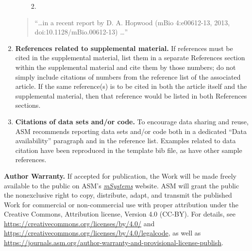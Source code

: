 \documentclass[
  lineno]{asm}
\providecommand{\tightlist}{%
  \setlength{\itemsep}{0pt}\setlength{\parskip}{0pt}}\usepackage{longtable,booktabs,array}
\begin{document}
\begin{enumerate}
\begin{itemize}
    \begin{enumerate}
    \def\labelenumii{\arabic{enumii})}
    \setcounter{enumii}{2005}
    \tightlist
    \item
    \end{enumerate}
  \end{itemize}

  \begin{quote}
   ``\ldots  in a recent report by D. A. Hopwood (mBio 4:e00612-13, 2013, doi:10.1128/mBio.00612-13) \ldots''
   \end{quote}
\item
  \textbf{References related to supplemental material.} If references
  must be cited in the supplemental material, list them in a separate
  References section within the supplemental material and cite them by
  those numbers; do not simply include citations of numbers from the
  reference list of the associated article. If the same reference(s) is
  to be cited in both the article itself and the supplemental material,
  then that reference would be listed in both References sections.
\item
  \textbf{Citations of data sets and/or code.} To encourage data sharing
  and reuse, ASM recommends reporting data sets and/or code both in a
  dedicated ``Data availability'' paragraph and in the reference list.
  Examples related to data citation have been reproduced in the template
  bib file, as have other sample references.
\end{enumerate}

\textbf{Author Warranty.} If accepted for publication, the Work will be
made freely available to the public on ASM's
\href{https://journals.asm.org/journal/msystems}{\emph{mSystems}}
website. ASM will grant the public the nonexclusive right to copy,
distribute, adapt, and transmit the published Work for commercial or
non-commercial use with proper attribution under the Creative Commons,
Attribution license, Version 4.0 (CC-BY). For details, see
\url{https://creativecommons.org/licenses/by/4.0/} and
\url{https://creativecommons.org/licenses/by/4.0/legalcode}, as well as
\url{https://journals.asm.org/author-warranty-and-provisional-license-publish}.
\end{document}

